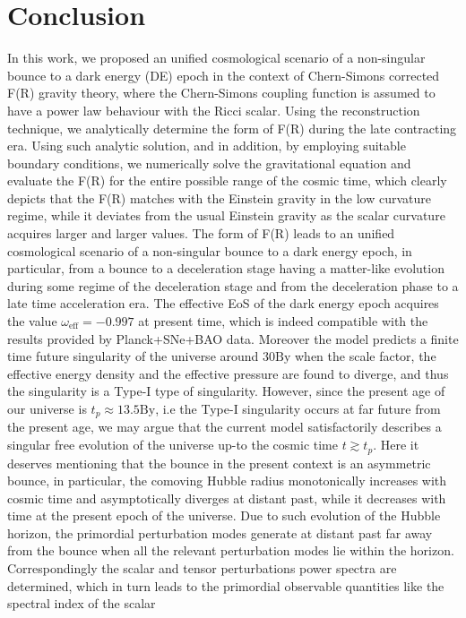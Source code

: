 \documentclass{article}
\begin{document}
\section{Conclusion}
In this work, we proposed an unified cosmological scenario of a non-singular bounce to a dark energy (DE) epoch in the context of 
Chern-Simons corrected F(R) gravity theory, where the Chern-Simons coupling function is assumed to have a power law behaviour with the 
Ricci scalar. Using the reconstruction technique, we analytically determine the form of F(R) during the late contracting era. Using such analytic solution, 
and in addition, by employing suitable boundary conditions, we numerically solve the gravitational equation and evaluate the F(R) for 
the entire possible range of the cosmic time, which clearly depicts that the F(R) matches with the Einstein gravity in the low curvature 
regime, while it deviates from the usual Einstein gravity as the scalar curvature acquires larger and larger values. 
The form of F(R) leads to an unified cosmological 
scenario of a non-singular bounce to a dark energy epoch, in particular, from a bounce to a deceleration stage having a 
matter-like evolution during some regime of the deceleration stage and from the deceleration phase to a late time acceleration era. The effective 
EoS of the dark energy epoch acquires the value $\omega_\mathrm{eff} = -0.997$ at present time, which is indeed compatible with 
the results provided by Planck+SNe+BAO data. Moreover the 
model predicts a finite time future singularity of the universe around $30\mathrm{By}$ when the scale factor, the effective energy density and 
the effective pressure are found to diverge, and thus the singularity is a Type-I type of singularity. However, since the present age of our universe is 
$t_p \approx 13.5\mathrm{By}$, i.e the Type-I singularity occurs at far future from the present age, 
we may argue that the current model satisfactorily describes a singular free evolution of the universe up-to the cosmic time 
$t \gtrsim t_p$. Here it deserves mentioning that the bounce in the present context is an asymmetric bounce, in particular, the comoving Hubble radius 
monotonically increases with cosmic time and asymptotically diverges at distant past, while 
it decreases with time at the present epoch of the universe. Due to such evolution of the Hubble horizon, the primordial perturbation modes 
generate at distant past far away from the bounce when all the relevant perturbation modes lie within the horizon. Correspondingly the scalar and tensor 
perturbations power spectra are determined, which in turn leads to the primordial observable quantities like the spectral index of the scalar 
\end{document}
